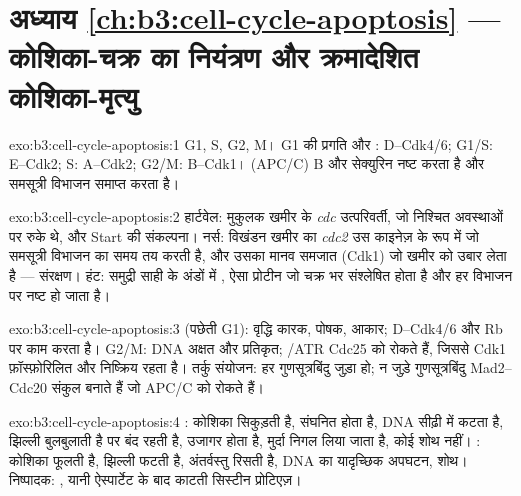 \section*{अध्याय \ref{ch:b3:cell-cycle-apoptosis} --- कोशिका-चक्र का नियंत्रण और क्रमादेशित कोशिका-मृत्यु}

\begin{solution}{exo:b3:cell-cycle-apoptosis:1}
G1, S, G2, M। G1 की प्रगति और :  D--Cdk4/6;
G1/S:  E--Cdk2; S:  A--Cdk2; G2/M:  B--Cdk1।
 (APC/C)  B और सेक्युरिन नष्ट करता है और
समसूत्री विभाजन समाप्त करता है।
\end{solution}

\begin{solution}{exo:b3:cell-cycle-apoptosis:2}
हार्टवेल: मुकुलक खमीर के \emph{cdc} उत्परिवर्ती, जो निश्चित अवस्थाओं पर
रुके थे, और Start की संकल्पना। नर्स: विखंडन खमीर का \emph{cdc2}
उस काइनेज़ के रूप में जो समसूत्री विभाजन का समय तय करती है, और उसका
मानव समजात (Cdk1) जो खमीर को उबार लेता है --- संरक्षण। हंट: समुद्री
साही के अंडों में , ऐसा प्रोटीन जो चक्र भर संश्लेषित होता है और
हर विभाजन पर नष्ट हो जाता है।
\end{solution}

\begin{solution}{exo:b3:cell-cycle-apoptosis:3}
 (पछेती G1): वृद्धि कारक, पोषक, आकार;  D--Cdk4/6
और Rb पर काम करता है। G2/M: DNA अक्षत और प्रतिकृत; /ATR
Cdc25 को रोकते हैं, जिससे Cdk1 फ़ॉस्फ़ोरिलित और निष्क्रिय रहता है। तर्कु
संयोजन: हर गुणसूत्रबिंदु जुड़ा हो; न जुड़े गुणसूत्रबिंदु
Mad2--Cdc20 संकुल बनाते हैं जो APC/C को रोकते हैं।
\end{solution}

\begin{solution}{exo:b3:cell-cycle-apoptosis:4}
: कोशिका सिकुड़ती है,  संघनित होता है, DNA सीढ़ी में
कटता है, झिल्ली बुलबुलाती है पर बंद रहती है,  उजागर
होता है, मुर्दा निगल लिया जाता है, कोई शोथ नहीं। : कोशिका फूलती
है, झिल्ली फटती है, अंतर्वस्तु रिसती है, DNA का यादृच्छिक अपघटन, शोथ।
निष्पादक: , यानी ऐस्पार्टेट के बाद काटती सिस्टीन प्रोटिएज़।
\end{solution}


